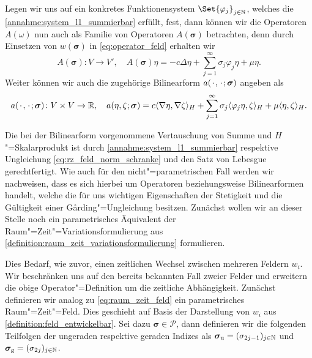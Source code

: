 Legen wir uns auf ein konkretes Funktionensystem $\Set{\varphi_{j}}_{j \in \mathbb{N}}$, welches die \cref{annahme:system_l1_summierbar} erfüllt, fest, dann können wir die Operatoren $A(\omega)$ nun auch als Familie von Operatoren $A(\bm\sigma)$ betrachten, denn durch Einsetzen von $w(\bm\sigma)$ in \cref{eq:operator_feld} erhalten wir
\begin{equation}
\label{eq:operator_parameter}
    A(\bm\sigma) \colon V \to V', \quad A(\bm\sigma) \eta = -c \Delta \eta + \sum_{j = 1}^{\infty} \sigma_{j} \varphi_{j} \eta + \mu \eta.
\end{equation}
Weiter können wir auch die zugehörige Bilinearform $a({\mkern2mu\cdot\mkern2mu}, {\mkern2mu\cdot\mkern2mu}; \bm\sigma)$ angeben als
\begin{equation}
\label{eq:bilinearform_parameter}
    \begin{aligned}
    a({\mkern2mu\cdot\mkern2mu}, {\mkern2mu\cdot\mkern2mu}; \bm\sigma) \colon V \times V \to \mathbb{R},
    \quad a(\eta, \zeta; \bm\sigma) = c\langle\nabla \eta,\nabla \zeta\rangle_{H} + \sum_{j = 1}^{\infty} \sigma_{j} \langle\varphi_{j} \eta,\zeta\rangle_{H} + \mu \langle\eta,\zeta\rangle_{H}.
    \end{aligned}
\end{equation}

Die bei der Bilinearform vorgenommene Vertauschung von Summe und $H$"=Skalarprodukt ist durch \cref{annahme:system_l1_summierbar} respektive Ungleichung \cref{eq:rz_feld_norm_schranke} und den Satz von Lebesgue gerechtfertigt.
Wie auch für den nicht"=parametrischen Fall werden wir nachweisen, dass es sich hierbei um Operatoren beziehungsweise Bilinearformen handelt, welche die für uns wichtigen Eigenschaften der Stetigkeit und die Gültigkeit einer G\aa{}rding"=Ungleichung besitzen.
Zunächst wollen wir an dieser Stelle noch ein parametrisches Äquivalent der Raum"=Zeit"=Variationsformulierung aus \cref{definition:raum_zeit_variationsformulierung} formulieren.

Dies Bedarf, wie zuvor, einen zeitlichen Wechsel zwischen mehreren Feldern $w_{i}$.
Wir beschränken uns auf den bereits bekannten Fall zweier Felder und erweitern die obige Operator"=Definition um die zeitliche Abhängigkeit.
Zunächst definieren wir analog zu \cref{eq:raum_zeit_feld} ein parametrisches Raum"=Zeit"=Feld.
Dies geschieht auf Basis der Darstellung von $w_{i}$ aus \cref{definition:feld_entwickelbar}.
Sei dazu $\bm\sigma \in \mathcal P$, dann definieren wir die folgenden Teilfolgen der ungeraden respektive geraden Indizes als $\bm\sigma_{\text{u}} = (\sigma_{2j-1})_{j \in \mathbb{N}}$ und $\bm\sigma_{\text{g}} = (\sigma_{2j})_{j \in \mathbb{N}}$.

